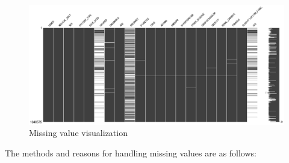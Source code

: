 \documentclass[
  journal=medium,
  manuscript=Report,
  year=2023,
  volume=37,
]{cup-journal}
\begin{document}
\begin{figure}[hbt!]
    \centering
    \includegraphics[width=\linewidth]{pic/missing_value.png}
    \caption{Missing value visualization}
    \label{missing_value}
\end{figure}

The methods and reasons for handling missing values are as follows:
\end{document}

